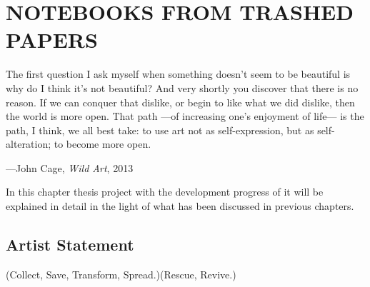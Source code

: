 \chapter{NOTEBOOKS FROM TRASHED PAPERS}





\begin{singlespace}
\epigraph{The first question I ask myself when something doesn't seem to be beautiful is why do I think it's not beautiful? And very shortly you discover that there is no reason. If we can conquer that dislike, or begin to like what we did dislike, then the world is more open. That path ---of increasing one's enjoyment of life--- is the path, I think, we all best take: to use art not as self-expression, but as self-alteration; to become more open.}{\hfill---John Cage, \textit{Wild Art}, 2013}
\end{singlespace}




In this chapter thesis project with the development progress of it will be explained in detail in the light of what has been discussed in previous chapters.








\section{Artist Statement}
(Collect, Save, Transform, Spread.)(Rescue, Revive.)

